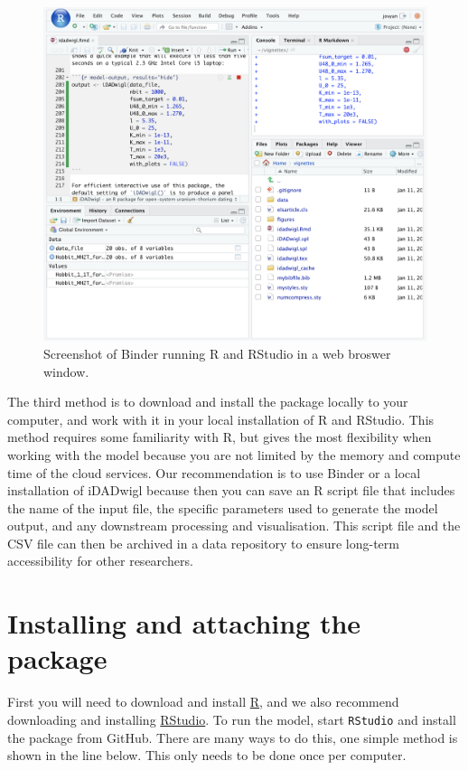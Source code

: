 \documentclass[]{elsarticle} %
\begin{document}
\begin{figure}
\includegraphics[width=0.95\linewidth]{figures/binder} \caption{Screenshot of Binder running R and RStudio in a web broswer window.}\label{fig:binderfig}
\end{figure}

The third method is to download and install the package locally to your computer, and work with it in your local installation of R and RStudio. This method requires some familiarity with R, but gives the most flexibility when working with the model because you are not limited by the memory and compute time of the cloud services. Our recommendation is to use Binder or a local installation of iDADwigl because then you can save an R script file that includes the name of the input file, the specific parameters used to generate the model output, and any downstream processing and visualisation. This script file and the CSV file can then be archived in a data repository to ensure long-term accessibility for other researchers.

\hypertarget{installing-and-attaching-the-package}{%
\section{Installing and attaching the package}\label{installing-and-attaching-the-package}}

First you will need to download and install \href{https://www.r-project.org/}{R}, and we also recommend downloading and installing \href{https://www.rstudio.com/}{RStudio}. To run the model, start \texttt{RStudio} and install the package from GitHub. There are many ways to do this, one simple method is shown in the line below. This only needs to be done once per computer.
\end{document}
